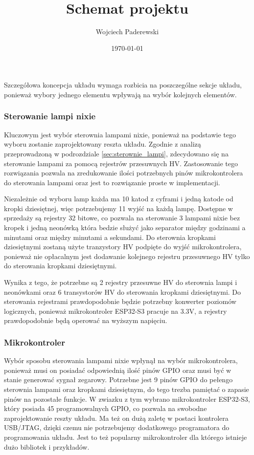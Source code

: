 \documentclass[../main.tex]{subfiles}
\author{Wojciech Paderewski}
\date{\today}
\title{Schemat projektu}
\begin{document}
Szczegółowa koncepcja układu wymaga rozbicia na poszczególne sekcje układu, ponieważ wybory jednego elementu wpływają na wybór kolejnych elementów.

\subsubsection{Sterowanie lampi nixie}
Kluczowym jest wybór sterownia lampami nixie, ponieważ na podstawie tego wyboru zostanie zaprojektowany reszta układu.
Zgodnie z analizą przeprowadzoną w podrozdziale \ref{sec:sterownie_lampi}, zdecydowano się na sterowanie lampami za pomocą rejestrów przesuwnych HV.
Zastosowanie tego rozwiązania pozwala na zredukowanie ilości potrzebnych pinów mikrokontrolera do sterowania lampami oraz jest to rozwiązanie proste w implementacji.

Niezależnie od wyboru lamp każda ma 10 katod z cyframi i jedną katode od kropki dziesiętnej, więc potrzebujemy 11 wyjść na każdą lampę.
Dostępne w sprzedaży są rejestry 32 bitowe, co pozwala na sterowanie 3 lampami nixie bez kropek i jedną neonówką która bedzie
służyć jako separator między godzinami a minutami oraz między minutami a sekundami. Do sterownia kropkami dziesiętnymi zostaną użyte tranzystory HV podpięte do wyjść mikrokontrolera,
ponieważ nie opłacalnym jest dodawanie kolejnego rejestru przesuwnego HV tylko do sterowania kropkami dziesiętnymi.

Wynika z tego, że potrzebne są 2 rejestry przesuwne HV do sterownia lampi i neonówkami oraz 6 transystorów HV do sterowania kropkami dziesiętnymi.
Do sterowania rejestrami prawdopodobnie będzie potrzebny konwerter poziomów logicznych, ponieważ mikrokontroler ESP32-S3 pracuje na 3.3V, a rejestry prawdopodobnie będą operować na wyższym napięciu.
\subsubsection{Mikrokontroler}
Wybór sposobu sterowania lampami nixie wpłynął na wybór mikrokontrolera, ponieważ musi on posiadać odpowiednią ilość pinów GPIO oraz musi być w stanie generować sygnał zegarowy.
Potrzebne jest 9 pinów GPIO do pełengo sterownia lampami oraz kropkami dziesiętnym, do tego trezba pamiętać o zapasie pinów na pozostałe funkcje. W zwiazku z tym
wybrano mikrokontroler ESP32-S3, który posiada 45 programowalnych GPIO, co pozwala na swobodne zaprojektowanie reszty układu. Ma też on dużą zaletę w postaci kontrolera USB/JTAG,
dzięki czemu nie potrzebujemy dodatkowego programatora do programowania układu. Jest to też popularny mikrokontroler dla którego istnieje dużo bibliotek i przykładów.
\end{document}
